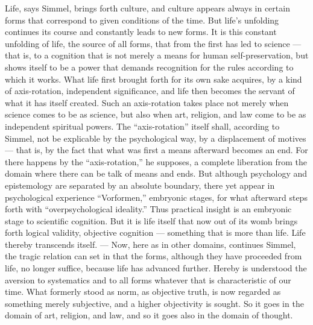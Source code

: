 \documentclass[12pt]{book}
\newcommand{\opage}[1]{\marginnote{\footnotesize\textit{[#1]}}}
\begin{document}
Life, says Simmel, brings forth culture, and culture appears always in certain forms that correspond to given
conditions of the time. But life's unfolding continues its course and constantly leads to new forms. It is this
constant unfolding of life, the source of all forms, that from the first has led to science --- that is, to a
cognition that is not merely a means for human self-preservation, but shows itself to be a power that demands
recognition for the rules according to which it works. What life first brought forth for its own sake acquires,
by a kind of axis-rotation, independent significance, and life then becomes the servant of what it has itself
created. Such an axis-rotation takes place not merely when science comes to be as science, but also when art,
religion, and law come to be as independent \opage{93}spiritual powers. The ``axis-rotation'' itself shall, according to
Simmel, not be explicable by the psychological way, by a displacement of motives --- that is, by the fact that
what was first a means afterward becomes an end. For there happens by the ``axis-rotation,'' he supposes, a
complete liberation from the domain where there can be talk of means and ends. But although psychology and
epistemology are separated by an absolute boundary, there yet appear in psychological experience ``Vorformen,''
embryonic stages, for what afterward steps forth with ``overpsychological ideality.'' Thus practical insight is
an embryonic stage to scientific cognition. But it is life itself that now out of its womb brings forth logical
validity, objective cognition --- something that is more than life. Life thereby transcends itself. --- Now, here
as in other domains, continues Simmel, the tragic relation can set in that the forms, although they have proceeded
from life, no longer suffice, because life has advanced further. Hereby is understood the aversion to systematics
and to all forms whatever that is characteristic of our time. What formerly stood as norm, as objective truth, is
now regarded as something merely subjective, and a higher objectivity is sought. So it goes in the domain of art,
religion, and law, and so it goes also in the domain of thought.
\end{document}
